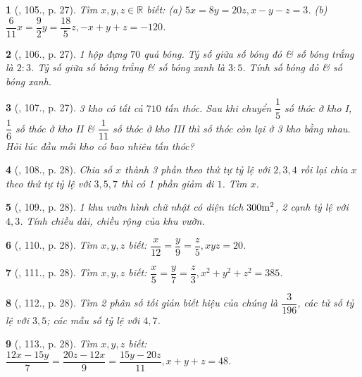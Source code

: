 \documentclass{article}
\newtheorem{baitoan}{}
\begin{document}
\begin{baitoan}[\cite{Tuyen_Toan_7}, 105., p. 27]
	Tìm $x,y,z\in\mathbb{R}$ biết: (a) $5x = 8y = 20z,x - y - z = 3$. (b) $\dfrac{6}{11}x = \dfrac{9}{2}y = \dfrac{18}{5}z,-x + y + z = -120$.
\end{baitoan}

\begin{baitoan}[\cite{Tuyen_Toan_7}, 106., p. 27]
	1 hộp đựng $70$ quả bóng. Tỷ số giữa số bóng đỏ \& số bóng trắng là $2:3$. Tỷ số giữa số bóng trắng \& số bóng xanh là $3:5$. Tính số bóng đỏ \& số bóng xanh.
\end{baitoan}

\begin{baitoan}[\cite{Tuyen_Toan_7}, 107., p. 27]
	3 kho có tất cả $710$ tấn thóc. Sau khi chuyển $\dfrac{1}{5}$ số thóc ở kho I, $\dfrac{1}{6}$ số thóc ở kho II \& $\dfrac{1}{11}$ số thóc ở kho III thì số thóc còn lại ở 3 kho bằng nhau. Hỏi lúc đầu mỗi kho có bao nhiêu tấn thóc?
\end{baitoan}

\begin{baitoan}[\cite{Tuyen_Toan_7}, 108., p. 28]
	Chia số $x$ thành 3 phần theo thứ tự tỷ lệ với $2,3,4$ rồi lại chia $x$ theo thứ tự tỷ lệ với $3,5,7$ thì có 1 phần giảm đi $1$. Tìm $x$.
\end{baitoan}

\begin{baitoan}[\cite{Tuyen_Toan_7}, 109., p. 28]
	1 khu vườn hình chữ nhật có diện tích $\rm300m^2$, 2 cạnh tỷ lệ với $4,3$. Tính chiều dài, chiều rộng của khu vườn.
\end{baitoan}

\begin{baitoan}[\cite{Tuyen_Toan_7}, 110., p. 28]
	Tìm $x,y,z$ biết: $\dfrac{x}{12} = \dfrac{y}{9} = \dfrac{z}{5},xyz = 20$.
\end{baitoan}

\begin{baitoan}[\cite{Tuyen_Toan_7}, 111., p. 28]
	Tìm $x,y,z$ biết: $\dfrac{x}{5} = \dfrac{y}{7} = \dfrac{z}{3},x^2 + y^2 + z^2 = 385$.
\end{baitoan}

\begin{baitoan}[\cite{Tuyen_Toan_7}, 112., p. 28]
	Tìm 2 phân số tối giản biết hiệu của chúng là $\dfrac{3}{196}$, các tử số tỷ lệ với $3,5$; các mẫu số tỷ lệ với $4,7$.
\end{baitoan}

\begin{baitoan}[\cite{Tuyen_Toan_7}, 113., p. 28]
	Tìm $x,y,z$ biết: $\dfrac{12x - 15y}{7} = \dfrac{20z - 12x}{9} = \dfrac{15y - 20z}{11},x + y + z = 48$.
\end{baitoan}
\end{document}
